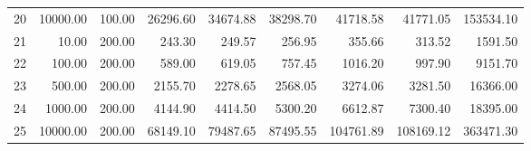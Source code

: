 \begin{table}[ht]
\begin{tabular}{rrrrrrrrr}
  20 & 10000.00 & 100.00 & 26296.60 & 34674.88 & 38298.70 & 41718.58 & 41771.05 & 153534.10 \\ 
  21 & 10.00 & 200.00 & 243.30 & 249.57 & 256.95 & 355.66 & 313.52 & 1591.50 \\ 
  22 & 100.00 & 200.00 & 589.00 & 619.05 & 757.45 & 1016.20 & 997.90 & 9151.70 \\ 
  23 & 500.00 & 200.00 & 2155.70 & 2278.65 & 2568.05 & 3274.06 & 3281.50 & 16366.00 \\ 
  24 & 1000.00 & 200.00 & 4144.90 & 4414.50 & 5300.20 & 6612.87 & 7300.40 & 18395.00 \\ 
  25 & 10000.00 & 200.00 & 68149.10 & 79487.65 & 87495.55 & 104761.89 & 108169.12 & 363471.30 \\ 
   \hline
\end{tabular}
\end{table}
